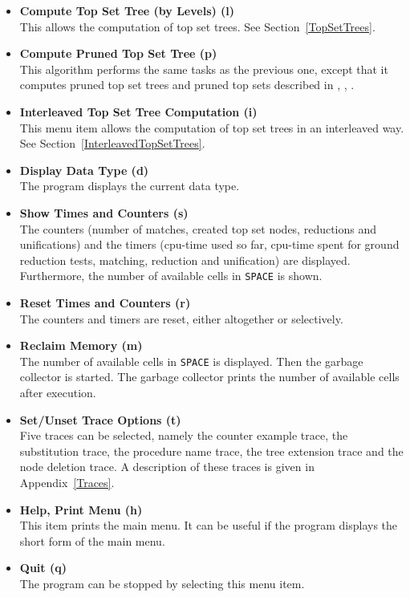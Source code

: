 \begin{itemize}
\item{\bf Compute Top Set Tree (by Levels) (l)}\\
This allows the computation of top set trees.  See Section~\ref{TopSetTrees}.

\item{\bf Compute Pruned Top Set Tree (p)}\\
This algorithm performs the same tasks as the previous one, except that 
it computes pruned top set trees and pruned top sets described in
\cite{Buendgen:91b}, \cite{Eckhardt:91}, \cite{BuendgenEckhardt:92}.

\item{\bf Interleaved Top Set Tree Computation (i)}\\
This menu item allows the computation of top set trees in an interleaved
way.  See Section~\ref{InterleavedTopSetTrees}.

\item{\bf Display Data Type (d)}\\
The program displays the current data type.

\item{\bf Show Times and Counters (s)}\\
The counters (number of matches, created top set nodes, reductions 
and unifications) and
the timers (cpu-time used so far, cpu-time spent for ground reduction
tests, matching, reduction and unification) are displayed.
Furthermore, the number of available cells in {\tt SPACE} is shown.

\item{\bf Reset Times and Counters (r)}\\
The counters and timers are reset, either altogether or selectively.

\item{\bf Reclaim Memory (m)}\\
The number of available cells in {\tt SPACE} is displayed. Then
the garbage collector is started. The garbage collector prints the
number of available cells after execution.

\item{\bf Set/Unset Trace Options (t)}\\
Five traces can be selected, namely the counter example trace, the
substitution trace, the procedure name trace, the tree extension trace 
and the node deletion trace. A description of these traces is given in
Appendix~\ref{Traces}.

\item{\bf Help, Print Menu (h)}\\
This item prints the main menu. It can be useful if the program
displays the short form  of the main menu.

\item{\bf Quit (q)}\\
The program can be stopped by selecting this menu item.
\end{itemize}

